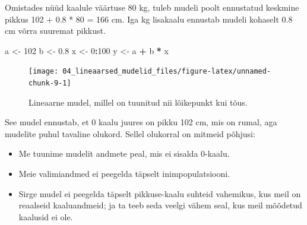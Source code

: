\documentclass[]{book}
\newenvironment{Shaded}{\begin{snugshade}}{\end{snugshade}}
\newcommand{\DataTypeTok}[1]{\textcolor[rgb]{0.13,0.29,0.53}{#1}}
\newcommand{\DecValTok}[1]{\textcolor[rgb]{0.00,0.00,0.81}{#1}}
\newcommand{\FloatTok}[1]{\textcolor[rgb]{0.00,0.00,0.81}{#1}}
\newcommand{\KeywordTok}[1]{\textcolor[rgb]{0.13,0.29,0.53}{\textbf{#1}}}
\newcommand{\NormalTok}[1]{#1}
\newcommand{\OperatorTok}[1]{\textcolor[rgb]{0.81,0.36,0.00}{\textbf{#1}}}
\newcommand{\StringTok}[1]{\textcolor[rgb]{0.31,0.60,0.02}{#1}}
\begin{document}
Omistades nüüd kaalule väärtuse 80 kg, tuleb mudeli poolt ennustatud keskmine pikkus 102 + 0.8 * 80 = 166 cm.
Iga kg lisakaalu ennustab mudeli kohaselt 0.8 cm võrra suuremat pikkust.

\begin{Shaded}
\begin{Highlighting}[]
\NormalTok{a <-}\StringTok{ }\DecValTok{102}
\NormalTok{b <-}\StringTok{ }\FloatTok{0.8}
\NormalTok{x <-}\StringTok{  }\DecValTok{0}\OperatorTok{:}\DecValTok{100} 
\NormalTok{y <-}\StringTok{  }\NormalTok{a }\OperatorTok{+}\StringTok{ }\NormalTok{b }\OperatorTok{*}\StringTok{ }\NormalTok{x}
\end{Highlighting}
\end{Shaded}

\begin{Shaded}
\end{Shaded}

\begin{figure}

{\centering \texttt{[image: 04\_lineaarsed\_mudelid\_files/figure-latex/unnamed-chunk-9-1]} 

}

\caption{Lineaarne mudel, millel on tuunitud nii lõikepunkt kui tõus.}\label{fig:unnamed-chunk-9}
\end{figure}

See mudel ennustab, et 0 kaalu juures on pikku 102 cm, mis on rumal, aga mudelite puhul tavaline olukord. Sellel olukorral on mitmeid põhjusi:

\begin{itemize}
\item
  Me tuunime mudelit andmete peal, mis ei sisalda 0-kaalu.
\item
  Meie valimiandmed ei peegelda täpselt inimpopulatsiooni.
\item
  Sirge mudel ei peegelda täpselt pikkuse-kaalu suhteid vahemikus, kus meil on reaalseid kaaluandmeid; ja ta teeb seda veelgi vähem seal, kus meil mõõdetud kaalusid ei ole.
\end{itemize}
\end{document}
